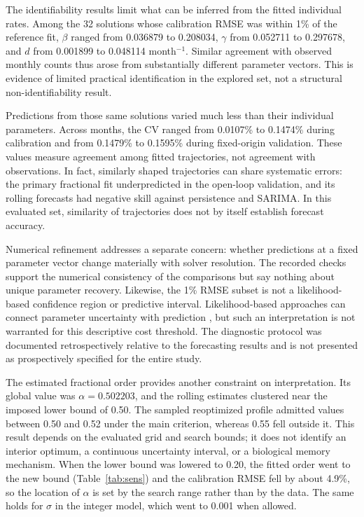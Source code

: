 \documentclass[pdflatex,sn-mathphys-ay,lineno]{sn-jnl}
\begin{document}
The identifiability results limit what can be inferred from the fitted individual rates. Among the 32 solutions whose calibration RMSE was within 1\% of the reference fit, $\beta$ ranged from 0.036879 to 0.208034, $\gamma$ from 0.052711 to 0.297678, and $d$ from 0.001899 to 0.048114 month$^{-1}$. Similar agreement with observed monthly counts thus arose from substantially different parameter vectors. This is evidence of limited practical identification in the explored set, not a structural non-identifiability result.

Predictions from those same solutions varied much less than their individual parameters. Across months, the CV ranged from 0.0107\% to 0.1474\% during calibration and from 0.1479\% to 0.1595\% during fixed-origin validation. These values measure agreement among fitted trajectories, not agreement with observations. In fact, similarly shaped trajectories can share systematic errors: the primary fractional fit underpredicted in the open-loop validation, and its rolling forecasts had negative skill against persistence and SARIMA. In this evaluated set, similarity of trajectories does not by itself establish forecast accuracy.

Numerical refinement addresses a separate concern: whether predictions at a fixed parameter vector change materially with solver resolution. The recorded checks support the numerical consistency of the comparisons but say nothing about unique parameter recovery. Likewise, the 1\% RMSE subset is not a likelihood-based confidence region or predictive interval. Likelihood-based approaches can connect parameter uncertainty with prediction \citep{simpson2024}, but such an interpretation is not warranted for this descriptive cost threshold. The diagnostic protocol was documented retrospectively relative to the forecasting results and is not presented as prospectively specified for the entire study.

The estimated fractional order provides another constraint on interpretation. Its global value was $\alpha=0.502203$, and the rolling estimates clustered near the imposed lower bound of 0.50. The sampled reoptimized profile admitted values between 0.50 and 0.52 under the main criterion, whereas 0.55 fell outside it. This result depends on the evaluated grid and search bounds; it does not identify an interior optimum, a continuous uncertainty interval, or a biological memory mechanism. When the lower bound was lowered to 0.20, the fitted order went to the new bound (Table~\ref{tab:sens}) and the calibration RMSE fell by about 4.9\%, so the location of $\alpha$ is set by the search range rather than by the data. The same holds for $\sigma$ in the integer model, which went to 0.001 when allowed.
\end{document}
